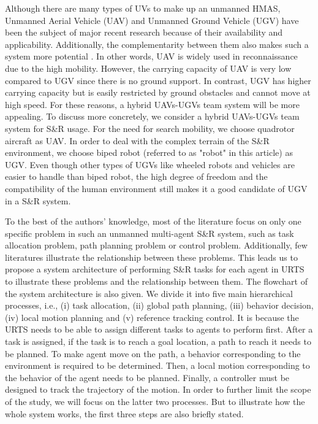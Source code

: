 \documentclass[journal,12pt,onecolumn,draftclsnofoot,]{IEEEtran}
\begin{document}
Although there are many types of UVs to make up an unmanned HMAS, Unmanned Aerial Vehicle (UAV) and Unmanned Ground Vehicle (UGV) have been the subject of major recent research because of their availability and applicability. Additionally, the complementarity between them also makes such a system more potential \cite{arbanas2018decentralized}. In other words, UAV is widely used in reconnaissance due to the high mobility. However, the carrying capacity of UAV is very low compared to UGV since there is no ground support. In contrast, UGV has higher carrying capacity but is easily restricted by ground obstacles and cannot move at high speed. For these reasons, a hybrid UAVs-UGVs team system will be more appealing. To discuss more concretely, we consider a hybrid UAVs-UGVs team system for S\&R usage. For the need for search mobility, we choose quadrotor aircraft as UAV. In order to deal with the complex terrain of the S\&R environment, we choose biped robot (referred to as "robot" in this article) as UGV. Even though other types of UGVs like wheeled robots and vehicles are easier to handle than biped robot, the high degree of freedom and the compatibility of the human environment still makes it a good candidate of UGV in a S\&R system.

To the best of the authors' knowledge, most of the literature focus on only one specific problem in such an unmanned multi-agent S\&R system, such as task allocation problem, path planning problem or control problem. Additionally, few literatures illustrate the relationship between these problems. This leads us to propose a system architecture of performing S\&R tasks for each agent in URTS to illustrate these problems and the relationship between them. The flowchart of the system architecture is also given. We divide it into five main hierarchical processes, i.e., (i) task allocation, (ii) global path planning, (iii) behavior decision, (iv) local motion planning and (v) reference tracking control. It is because the URTS needs to be able to assign different tasks to agents to perform first. After a task is assigned, if the task is to reach a goal location, a path to reach it needs to be planned. To make agent move on the path, a behavior corresponding to the environment is required to be determined. Then, a local motion corresponding to the behavior of the agent needs to be planned. Finally, a controller must be designed to track the trajectory of the motion. In order to further limit the scope of the study, we will focus on the latter two processes. But to illustrate how the whole system works, the first three steps are also briefly stated.
\end{document}
